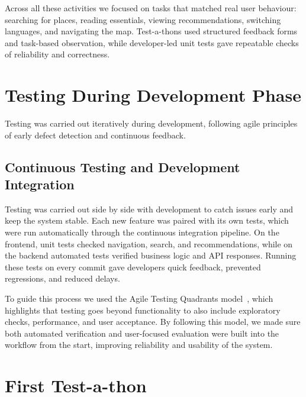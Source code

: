 Across all these activities we focused on tasks that matched real user behaviour: searching for places, reading essentials, viewing recommendations, switching languages, and navigating the map. Test-a-thons used structured feedback forms and task-based observation, while developer-led unit tests gave repeatable checks of reliability and correctness.



\clearpage
\cleardoublepage
\section{Testing During Development Phase}
\label{sec:dev-phase-testing}

Testing was carried out iteratively during development, following agile principles of early defect detection and continuous feedback. 
\subsection{Continuous Testing and Development Integration}
Testing was carried out side by side with development to catch issues early and keep the system stable. 
Each new feature was paired with its own tests, which were run automatically through the continuous 
integration pipeline. On the frontend, unit tests checked navigation, search, and recommendations, while 
on the backend automated tests verified business logic and API responses. Running these tests on every 
commit gave developers quick feedback, prevented regressions, and reduced delays.

To guide this process we used the Agile Testing Quadrants model~\cite{Crispin2009AgileTesting}, which 
highlights that testing goes beyond functionality to also include exploratory checks, performance, and user 
acceptance. By following this model, we made sure both automated verification and user-focused evaluation 
were built into the workflow from the start, improving reliability and usability of the system.

\section{First Test-a-thon}
\label{sec:testathon-one}

